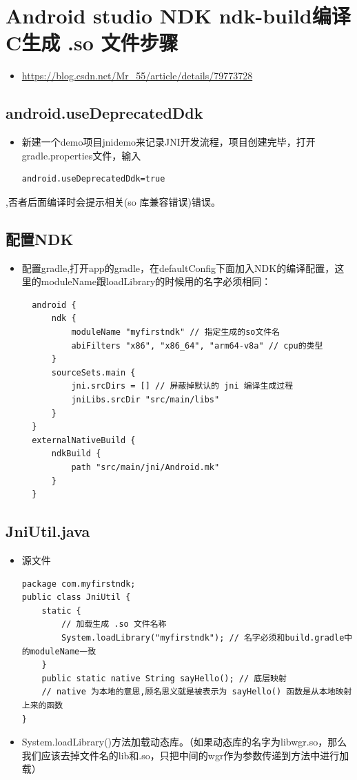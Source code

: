 \documentclass[9pt, b5paper]{article}
\begin{document}
\section{Android studio NDK ndk-build编译C生成 .so 文件步骤}
\label{sec-2}
\begin{itemize}
\item \url{https://blog.csdn.net/Mr_55/article/details/79773728}
\end{itemize}
\subsection{android.useDeprecatedDdk}
\label{sec-2-1}
\begin{itemize}
\item 新建一个demo项目jnidemo来记录JNI开发流程，项目创建完毕，打开gradle.properties文件，输入
\begin{verbatim}
android.useDeprecatedDdk=true
\end{verbatim}
\end{itemize}
,否者后面编译时会提示相关(so 库兼容错误)错误。

\subsection{配置NDK}
\label{sec-2-2}
\begin{itemize}
\item 配置gradle,打开app的gradle，在defaultConfig下面加入NDK的编译配置，这里的moduleName跟loadLibrary的时候用的名字必须相同：
\begin{verbatim}
  android {
      ndk {
          moduleName "myfirstndk" // 指定生成的so文件名
          abiFilters "x86", "x86_64", "arm64-v8a" // cpu的类型
      }
      sourceSets.main {
          jni.srcDirs = [] // 屏蔽掉默认的 jni 编译生成过程
          jniLibs.srcDir "src/main/libs"
      }
  }
  externalNativeBuild {
      ndkBuild {
          path "src/main/jni/Android.mk"
      }
  }
\end{verbatim}
\end{itemize}

\subsection{JniUtil.java}
\label{sec-2-3}
\begin{itemize}
\item 源文件
\begin{verbatim}
package com.myfirstndk;
public class JniUtil {
    static {
        // 加载生成 .so 文件名称
        System.loadLibrary("myfirstndk"); // 名字必须和build.gradle中的moduleName一致
    }
    public static native String sayHello(); // 底层映射
    // native 为本地的意思,顾名思义就是被表示为 sayHello() 函数是从本地映射上来的函数
}
\end{verbatim}
\item System.loadLibrary()方法加载动态库。（如果动态库的名字为libwgr.so，那么我们应该去掉文件名的lib和.so，只把中间的wgr作为参数传递到方法中进行加载）
\end{itemize}
\end{document}
